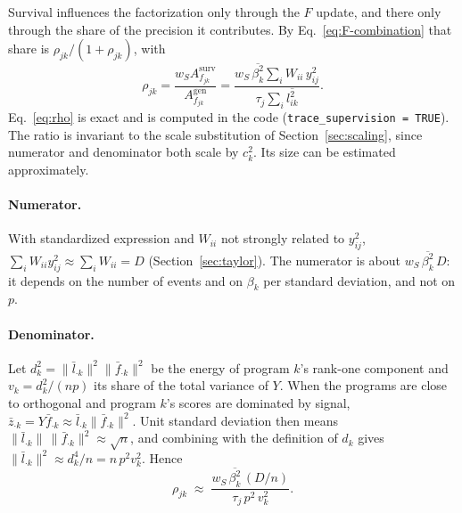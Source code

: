 \documentclass[11pt]{article}
\newcommand{\lsec}[2]{\overline{l^2_{#1#2}}}
\newcommand{\betasec}[1]{\overline{\beta^2_{#1}}}
\newcommand{\ws}{w_S}
\begin{document}
Survival influences the factorization only through the $F$ update, and there
only through the share of the precision it contributes. By
Eq.~\eqref{eq:F-combination} that share is $\rho_{jk}/(1+\rho_{jk})$, with
\begin{equation}\label{eq:rho}
  \rho_{jk} = \frac{\ws A^{\text{surv}}_{f_{jk}}}{A^{\text{gen}}_{f_{jk}}}
  = \frac{\ws\,\betasec{k}\sum_i W_{ii}\,y_{ij}^2}{\tau_j\sum_i\lsec{i}{k}} .
\end{equation}
Eq.~\eqref{eq:rho} is exact and is computed in the code
(\texttt{trace\_supervision = TRUE}). The ratio is invariant to the scale
substitution of Section~\ref{sec:scaling}, since numerator and denominator both
scale by $c_k^2$. Its size can be estimated approximately.

\paragraph{Numerator.} With standardized expression and $W_{ii}$ not strongly
related to $y_{ij}^2$, $\sum_i W_{ii}y_{ij}^2 \approx \sum_i W_{ii} = D$
(Section~\ref{sec:taylor}). The numerator is about $\ws\,\betasec{k}\,D$: it
depends on the number of events and on $\beta_k$ per standard deviation, and not
on $p$.

\paragraph{Denominator.} Let $d_k^2 = \lVert\bar l_{\cdot k}\rVert^2\lVert\bar f_{\cdot k}\rVert^2$
be the energy of program $k$'s rank-one component and $v_k = d_k^2/(np)$ its
share of the total variance of $Y$. When the programs are close to orthogonal
and program $k$'s scores are dominated by signal,
$\bar z_{\cdot k} = Y\bar f_{\cdot k} \approx \bar l_{\cdot k}\lVert\bar f_{\cdot k}\rVert^2$.
Unit standard deviation then means
$\lVert\bar l_{\cdot k}\rVert\,\lVert\bar f_{\cdot k}\rVert^2 \approx \sqrt n$,
and combining with the definition of $d_k$ gives
$\lVert\bar l_{\cdot k}\rVert^2 \approx d_k^4/n = n\,p^2 v_k^2$. Hence
\begin{equation}\label{eq:rho-approx}
  \rho_{jk} \;\approx\; \frac{\ws\,\betasec{k}\,(D/n)}{\tau_j\,p^2\,v_k^2}.
\end{equation}
\end{document}
